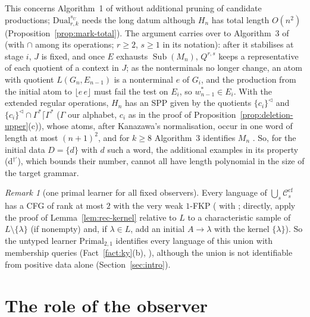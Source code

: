 \documentclass[11pt]{article}
\numberwithin{equation}{section}
\theoremstyle{plain}
\theoremstyle{definition}
\theoremstyle{remark}
\newtheorem{remark}[theorem]{Remark}
\theoremstyle{plain}
\newcommand{\eps}{\lambda}
\newcommand{\Lc}{^{\lhd}}
\newcommand{\Sub}{\operatorname{Sub}}
\newcommand{\Ccf}[1]{\mathcal C^{\mathrm{cf}}_{#1}}
\newcommand{\Lfl}{\lfloor}
\newcommand{\Rfl}{\rfloor}
\newcommand{\Lce}{\lceil}
\begin{document}
This concerns Algorithm~1 of \citet{ky2017} without additional pruning of
candidate productions; $\mathrm{Dual}^{s_U}_{r,k}$ needs the long datum
although $H_n$ has total length $O(n^2)$ (Proposition~\ref{prop:mark-total}).
The argument carries over to Algorithm~3 of \citet{kanazawa2023wollic}
(with $\cap$ among its operations; $r\ge2$, $s\ge1$ in its notation): after
it stabilises at stage $i$, $J$ is fixed, and once $E$ exhausts $\Sub(M_n)$,
$Q^{r,s}$ keeps a representative of each quotient of a context in $J$; as
the nonterminals no longer change, an atom with quotient $L(G_n,E_{n-1})$ is
a nonterminal $e$ of $G_i$, and the production from the initial atom to
$\Lfl e\,e\Rfl$ must fail the test on $E_i$, so $w^*_{n-1}\in E_i$.  With the
extended regular operations, $H_n$ has an SPP given by the quotients
$\{c_i\}\Lc$ and $\{c_i\}\Lc\cap\Gamma^*\Lce\Gamma^*$ ($\Gamma$ our
alphabet, $c_i$ as in the
proof of Proposition~\ref{prop:deletion-upper}(c)), whose atoms, after Kanazawa's normalisation,
occur in one word of length at most $(n+1)^2$, and for $k\ge8$
Algorithm~3 identifies $M_n$ \citep[Thm.~8]{kanazawa2023wollic}.  So, for the initial data $D=\{d\}$ with $d$ such a word, the additional
examples in its property (d$^{\dagger\prime}$), which bounds their number,
cannot all have length polynomial in the size of the target grammar.

\begin{remark}[one primal learner for all fixed observers]\label{rem:uniform-known}
Every language of $\bigcup_s\Ccf s$ has a CFG of rank at most $2$ with the very weak
$1$-FKP (\citealp[Prop.~9.7]{kuriyama-tcs1} with
\citealp[Sec.~6.3]{yoshinaka2015}; directly, apply the proof of Lemma~\ref{lem:rec-kernel} relative to $L$
to a characteristic sample of $L\setminus\{\eps\}$ (if nonempty) and, if $\eps\in L$, add an
initial $A\to\eps$ with the kernel $\{\eps\}$).  So the untyped learner $\mathrm{Primal}_{2,1}$ identifies every language of
this union with membership queries (Fact~\ref{fact:ky}(b),
\citealp[Thm.~6]{ky2017}), although the union is not identifiable from
positive data alone (Section~\ref{sec:intro}).
\end{remark}


\section{The role of the observer}
\label{sec:duality}
\end{document}
